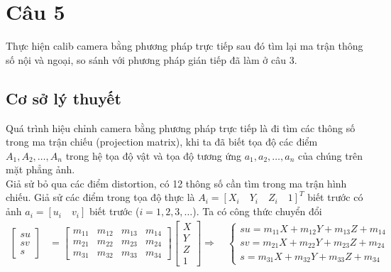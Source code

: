 \section*{Câu 5}
     Thực hiện calib camera bằng phương pháp trực tiếp sau đó tìm lại ma trận thông số nội và ngoại, so sánh với phương pháp gián tiếp đã làm ở câu 3.
     \subsection{Cơ sở lý thuyết}
          \hspace*{0.6cm}Quá trình hiệu chỉnh camera bằng phương pháp trực tiếp là đi tìm các thông số trong ma trận chiếu (projection matrix), khi ta đã
          biết tọa độ các điểm $A_1, A_2, \dots, A_n$ trong hệ tọa độ vật và tọa độ tương ứng $a_1, a_2, \dots, a_n$ của chúng trên mặt phẳng ảnh.\\ %
          \hspace*{0.6cm}Giả sử bỏ qua các điểm distortion, có 12 thông số cần tìm trong ma trận hình chiếu. Giả sử các điểm trong tọa độ thực là $A_i = [X_i \quad Y_i \quad Z_i \quad 1]^T$ biết trước có ảnh $a_i = [u_i \quad v_i]$ biết trước ($i = 1, 2, 3, \dots$). Ta có công thức chuyển đổi
          \begin{align}
               \begin{bmatrix}
               su \\
               sv \\
               s
               \end{bmatrix}
               &=
               \begin{bmatrix}
               m_{11} & m_{12} & m_{13} & m_{14} \\
               m_{21} & m_{22} & m_{23} & m_{24} \\
               m_{31} & m_{32} & m_{33} & m_{34}
               \end{bmatrix}
               \begin{bmatrix}
               X \\ Y \\ Z \\ 1
               \end{bmatrix}
               \Rightarrow \quad
               \begin{cases}
               su = m_{11}X + m_{12}Y + m_{13}Z + m_{14} \\
               sv = m_{21}X + m_{22}Y + m_{23}Z + m_{24} \\
               s  = m_{31}X + m_{32}Y + m_{33}Z + m_{34}
               \end{cases}
               \label{c5_eq1}
          \end{align}
